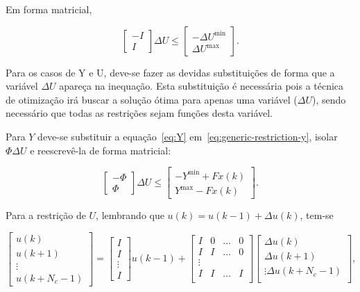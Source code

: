 Em forma matricial,

\begin{equation}
	\label{eq:generic-restriction-du-matrix-form}
	\begin{bmatrix}
		-I \\
		I
	\end{bmatrix} \Delta{}U \le
	\begin{bmatrix}
		-\Delta{}U^{\min} \\
		\Delta{}U^{\max}
	\end{bmatrix}.
\end{equation}

Para os casos de Y e U, deve-se fazer as devidas substituições de forma que a
variável \( \Delta{}U \) apareça na inequação. Esta substituição é necessária
pois a técnica de otimização irá buscar a solução ótima para apenas uma variável
(\( \Delta{}U \)), sendo necessário que todas as restrições sejam funções desta
variável.

Para \( Y \) deve-se substituir a equação~\eqref{eq:Y}
em~\eqref{eq:generic-restriction-y}, isolar \( \Phi{}\Delta{}U \) e reescrevê-la
de forma matricial:

\begin{equation}
	\label{eq:generic-restriction-y-matrix-form}
	\begin{bmatrix}
		-\Phi \\
		\Phi
	\end{bmatrix} \Delta{}U \le
	\begin{bmatrix}
		-Y^{\min} + Fx(k) \\
		Y^{\max} - Fx(k)
	\end{bmatrix}.
\end{equation}

Para a restrição de \( U \), lembrando que \( u(k) = u(k-1) + \Delta{}u(k) \),
tem-se

\begin{equation}
	\label{eq:generic-restriction-u-matrix-eq}
	\begin{bmatrix}
		u(k)   \\
		u(k+1) \\
		\vdots \\
		u(k+N_c-1)
	\end{bmatrix} =
	\begin{bmatrix}
		I      \\
		I      \\
		\vdots \\
		I
	\end{bmatrix}
	u(k-1) +
	\begin{bmatrix}
		I & 0 & \hdots & 0 \\
		I & I & \hdots & 0 \\
		\vdots             \\
		I & I & \hdots & I \\
	\end{bmatrix}
	\begin{bmatrix}
		\Delta{}u(k)       \\
		\Delta{}u(k+1)     \\
		\vdots
		\Delta{}u(k+N_c-1) \\
	\end{bmatrix},
\end{equation}

